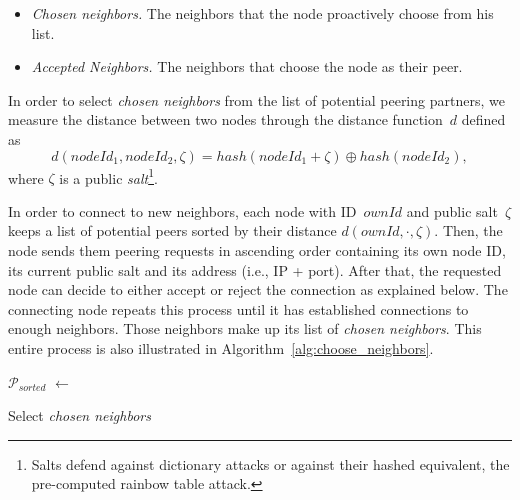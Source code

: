 \documentclass[../main.tex]{subfiles}
\begin{document}
\begin{itemize}
    \item \textit{Chosen neighbors.} The neighbors that the node proactively choose from his list.
    \item \textit{Accepted Neighbors.} The neighbors that choose the node as their peer.
\end{itemize}

In order to select \emph{chosen neighbors} from the list of potential peering partners, we measure the distance between two nodes through the distance function~$d$ defined as
\begin{equation*}\label{eq:salted_distance}
    d(nodeId_1, nodeId_2, \zeta) = hash(nodeId_1 + \zeta) \oplus hash(nodeId_2),
\end{equation*}
where $\zeta$ is a public \textit{salt}\footnote{Salts defend against dictionary attacks or against their hashed equivalent, the pre-computed rainbow table attack.}.

In order to connect to new neighbors, each node with ID~$ownId$ and public salt~$\zeta$ keeps a list of potential peers sorted by their distance $d(ownId, \cdot, \zeta)$.
Then, the node sends them peering requests in ascending order containing its own node ID, its current public salt and its address (i.e., IP + port).
After that, the requested node can decide to either accept or reject the connection as explained below.
The connecting node repeats this process until it has established connections to enough neighbors.
Those neighbors make up its list of \emph{chosen neighbors}.
This entire process is also illustrated in Algorithm~\ref{alg:choose_neighbors}.

\begin{algorithm}[htb]
\DontPrintSemicolon
{}
\BlankLine
$\mathcal{P}_{sorted}$ $\gets$ \;
\BlankLine
{}
\caption{Select \emph{chosen neighbors}}
\label{alg:choose_neighbors}
\end{algorithm}
\end{document}
